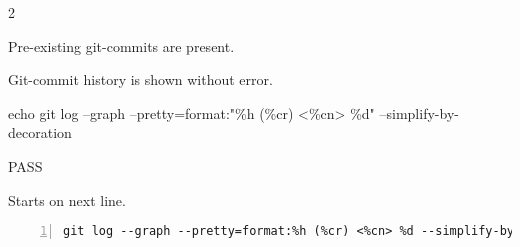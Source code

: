 \begin{description}[align=right,leftmargin=3.2cm,labelindent=3.0cm]
\item[Step:] 2
\item[Confirm:] Pre-existing git-commits are present.
\item[Expectation:] Git-commit history is shown without error.
\item[Command:] echo git  log --graph --pretty=format:"\%h (\%cr) <\%cn> \%d" --simplify-by-decoration
\item[Test Result:] PASS
\item[Evidence:] Starts on next line.
\end{description}
\begin{lstlisting}[numbers=left]
git log --graph --pretty=format:%h (%cr) <%cn> %d --simplify-by-decoration

\end{lstlisting}
